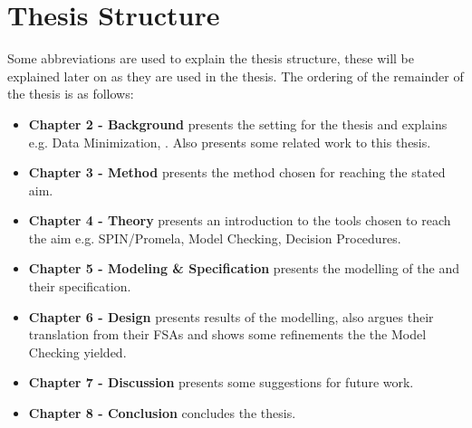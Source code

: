




\section{Thesis Structure}

Some abbreviations are used to explain the thesis structure, these will be explained later on as they are used in the thesis. The ordering of the remainder of the thesis is as follows: \\

\begin{itemize}
\setlength\itemsep{1em}
\item[] \textbf{Chapter 2 - Background} presents the setting for the thesis and explains e.g. Data Minimization, \wsn. Also presents some related work to this thesis.
\item[] \textbf{Chapter 3 - Method} presents the method chosen for reaching the stated aim. 
\item[] \textbf{Chapter 4 - Theory} presents an introduction to the tools chosen to reach the aim e.g. SPIN/Promela, Model Checking, Decision Procedures.
\item[] \textbf{Chapter 5 - Modeling \& Specification} presents the modelling of the \wsns and their specification.
\item[] \textbf{Chapter 6 - Design} presents results of the modelling, also argues their translation from their FSAs and shows some refinements the the Model Checking yielded.
\item[] \textbf{Chapter 7 - Discussion} presents some suggestions for future work.
\item[] \textbf{Chapter 8 - Conclusion} concludes the thesis.
\end{itemize} 

